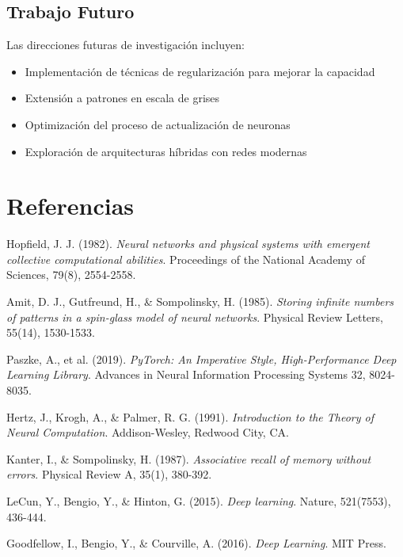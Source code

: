 \documentclass{article}
\begin{document}
\subsection{Trabajo Futuro}
Las direcciones futuras de investigación incluyen:
\begin{itemize}
    \item Implementación de técnicas de regularización para mejorar la capacidad
    \item Extensión a patrones en escala de grises
    \item Optimización del proceso de actualización de neuronas
    \item Exploración de arquitecturas híbridas con redes modernas
\end{itemize}

\section{Referencias}
\begin{thebibliography}{9}

Hopfield, J. J. (1982).
\textit{Neural networks and physical systems with emergent collective computational abilities}.
Proceedings of the National Academy of Sciences, 79(8), 2554-2558.

Amit, D. J., Gutfreund, H., \& Sompolinsky, H. (1985).
\textit{Storing infinite numbers of patterns in a spin-glass model of neural networks}.
Physical Review Letters, 55(14), 1530-1533.

Paszke, A., et al. (2019).
\textit{PyTorch: An Imperative Style, High-Performance Deep Learning Library}.
Advances in Neural Information Processing Systems 32, 8024-8035.

Hertz, J., Krogh, A., \& Palmer, R. G. (1991).
\textit{Introduction to the Theory of Neural Computation}.
Addison-Wesley, Redwood City, CA.

Kanter, I., \& Sompolinsky, H. (1987).
\textit{Associative recall of memory without errors}.
Physical Review A, 35(1), 380-392.

LeCun, Y., Bengio, Y., \& Hinton, G. (2015).
\textit{Deep learning}.
Nature, 521(7553), 436-444.

Goodfellow, I., Bengio, Y., \& Courville, A. (2016).
\textit{Deep Learning}.
MIT Press.

\end{thebibliography}
\end{document}
